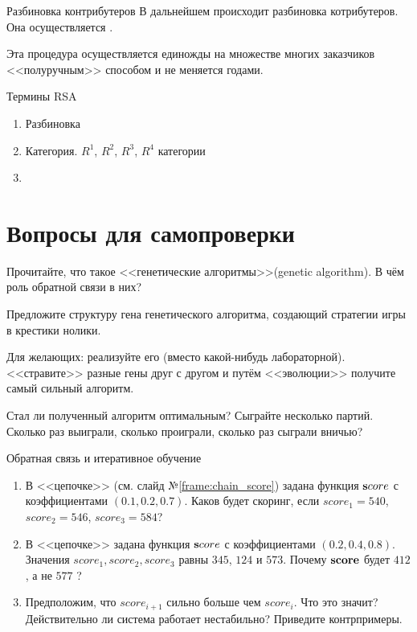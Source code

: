 \begin{frame}
	\Large
\end{frame}

\begin{frame}{Разбиновка контрибутеров}
	В дальнейшем происходит разбиновка котрибутеров. 
	Она осуществляется .
	
	Эта процедура осуществляется единожды на множестве многих заказчиков <<полуручным>>
	способом и не меняется годами.
\end{frame}

\begin{frame}{Термины RSA}\label{frame:rsa_risk_engine_terms}
	\begin{enumerate}
		\item Разбиновка 
		\item Категория. $R^1$, $R^2$, $R^3$, $R^4$ категории
		\item 		
	\end{enumerate}
\end{frame}


  
\section{Вопросы для самопроверки}

\begin{frame}
	Прочитайте, что такое <<генетические алгоритмы>>(genetic algorithm).
	В чём роль обратной связи в них?
	
	Предложите структуру гена генетического алгоритма, создающий стратегии игры в крестики нолики. 
	
	Для желающих: реализуйте его (вместо какой-нибудь лабораторной). 
	<<стравите>> разные гены друг с другом и путём <<эволюции>>
	получите самый сильный алгоритм.
	
	Стал ли полученный алгоритм оптимальным? Сыграйте несколько партий. Сколько раз выиграли, 
	сколько проиграли, сколько раз сыграли вничью?
	
\end{frame}

\begin{frame}{Обратная связь и итеративное обучение}
	\begin{enumerate}
		\item В <<цепочке>> (см. слайд №\ref{frame:chain_score}) задана функция
		$\bold score$ с коэффициентами $(0.1, 0.2, 0.7)$. Каков будет скоринг, 
		если $score_1=540$, $score_2=546$, $score_3=584$?
		\item В <<цепочке>> задана функция 	$\bold score$ 
		с коэффициентами $(0.2, 0.4, 0.8)$. Значения $score_1, score_2, score_3$
		равны $345$, $124$ и $573$. Почему $\bold {score}$ 
		будет $412$, 
		а не $577$ ?
		\item Предположим, что $score_{i+1}$ 
		сильно больше чем $score_i$. Что это значит? 
		Действительно ли система работает нестабильно? 
		Приведите контрпримеры.
		
	\end{enumerate}
\end{frame}


